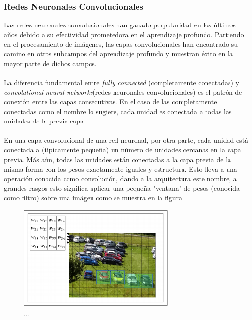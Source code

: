    \subsubsection{Redes Neuronales Convolucionales}
    Las redes neuronales convolucionales han ganado porpularidad en los últimos años debido a su efectividad prometedora en el aprendizaje profundo. Partiendo en el procesamiento de imágenes, las capas convolucionales han encontrado su camino en otros subcampos del aprendizaje profundo y muestran éxito en la mayor parte de dichos campos.\\\\ 
    La diferencia fundamental entre \textit{fully connected} (completamente conectadas) y \textit{convolutional neural networks}(redes neuronales convolucionales) es el patrón de conexión entre las capas consecutivas. En el caso de las completamente conectadas como el nombre lo sugiere, cada unidad es conectada a todas las unidades de la previa capa. \\\\
    En una capa convolucional de una red neuronal, por otra parte, cada unidad está conectada a (típicamente pequeña) un número de unidades cercanas en la capa previa. Más aún, todas las unidades están conectadas a la capa previa de la misma forma con los pesos exactamente iguales y estructura. Esto lleva a una operación conocida como convolución, dando a la arquitectura este nombre, a grandes rasgos esto significa aplicar una pequeña "ventana" de pesos (conocida como filtro) sobre una imágen como se muestra en la figura %
    
    
     \begin{figure}[H]
        \centering
        \includegraphics[width=0.7\textwidth]{capitulo2/images/CNN_window.png}
        \caption{...}
        \label{fig:CNNFilter}
    \end{figure}
    
    
    
